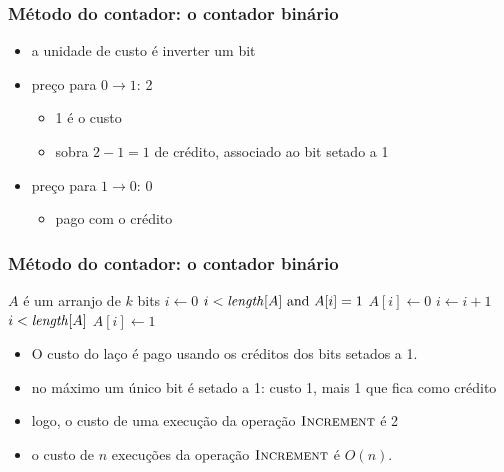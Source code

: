 \documentclass{beamer}
\begin{document}
\begin{frame}

\frametitle{Método do contador: o contador binário}

\begin{itemize}

  \item a unidade de custo é inverter um bit

  \item preço para $0 \rightarrow 1$: 2
   
  \begin{itemize}

    \item 1 é o custo

    \item sobra $2 - 1 = 1$ de crédito, associado ao bit setado a 1

  \end{itemize}

  \item preço para $1 \rightarrow 0$: 0

    \begin{itemize}

      \item pago com o crédito

    \end{itemize}
  
\end{itemize}

\end{frame}

\begin{frame}

\frametitle{Método do contador: o contador binário}

  \begin{codebox}
    \zi \Comment $A$ é um arranjo de $k$ bits
    \li $i \gets 0$
    \li \While $i < \id{length}[A] \mbox{ and } A[i] = 1$
    \li \Do 
    \li   $A[i] \gets 0$
    \li   $i \gets i + 1$
        \End
    \li \If $i < \id{length}[A]$
    \li \Then
    \li    $A[i] \gets 1$
        \End
  \end{codebox}

\begin{itemize}
\item O custo do laço é pago usando os créditos dos bits setados a 1.

\item no máximo um único bit é setado a 1: custo 1, mais 1 que fica como crédito

\item logo, o custo de uma execução da operação $\textnormal{\scshape Increment}$ é 2

\item o custo de $n$ execuções da operação $\textnormal{\scshape Increment}$ é $O(n)$.

\end{itemize}

\end{frame}
\end{document}
